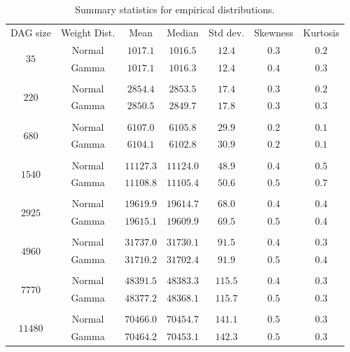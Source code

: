 \documentclass[12pt]{article}
\begin{document}
      \begin{table}
	\caption{Summary statistics for empirical distributions.} 
	\begin{center}	
		\begin{tabular}{c c c c c c c}
                  \toprule
                  DAG size & Weight Dist. & Mean & Median & Std dev. & Skewness & Kurtosis \\
                  \cmidrule{1-7}
                  \multirow{2}{*}{$35$} & Normal & $1017.1$ & $1016.5$ & $12.4$ & $0.3$ & $0.2$\\
                           & Gamma & $1017.1$ & $1016.3$ & $12.4$ & $0.4$ & $0.3$\\
                  \\
                  \multirow{2}{*}{$220$} & Normal & $2854.4$ & $2853.5$ & $17.4$ & $0.3$ & $0.2$\\
                           & Gamma & $2850.5$ & $2849.7$ & $17.8$ & $0.3$ & $0.3$\\
                  \\
                  \multirow{2}{*}{$680$} & Normal & $6107.0$ & $6105.8$ & $29.9$ & $0.2$ & $0.1$\\
                           & Gamma & $6104.1$ & $6102.8$ & $30.9$ & $0.2$ & $0.1$\\
                  \\
                  \multirow{2}{*}{$1540$} & Normal & $11127.3$ & $11124.0$ & $48.9$ & $0.4$ & $0.5$\\
                           & Gamma & $11108.8$ & $11105.4$ & $50.6$ & $0.5$ & $0.7$\\
                  \\
                  \multirow{2}{*}{$2925$} & Normal & $19619.9$ & $19614.7$ & $68.0$ & $0.4$ & $0.4$\\
                           & Gamma & $19615.1$ & $19609.9$ & $69.5$ & $0.5$ & $0.4$\\
                  \\
                  \multirow{2}{*}{$4960$} & Normal & $31737.0$ & $31730.1$ & $91.5$ & $0.4$ & $0.3$\\
                           & Gamma & $31710.2$ & $31702.4$ & $91.9$ & $0.5$ & $0.4$\\
                  \\
                  \multirow{2}{*}{$7770$} & Normal & $48391.5$ & $48383.3$ & $115.5$ & $0.4$ & $0.3$\\
                           & Gamma & $48377.2$ & $48368.1$ & $115.7$ & $0.5$ & $0.3$\\
                  \\
                  \multirow{2}{*}{$11480$} & Normal & $70466.0$ & $70454.7$ & $141.1$ & $0.5$ & $0.3$\\
                           & Gamma & $70464.2$ & $70453.1$ & $142.3$ & $0.5$ & $0.3$\\
		\bottomrule
		\end{tabular}
		\label{tb.emp_summary}
	\end{center}	
      \end{table}
\end{document}
